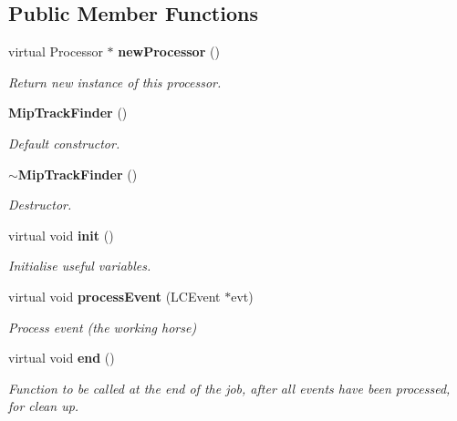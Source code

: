 \subsection*{Public Member Functions}
\begin{DoxyCompactItemize}
\item 
virtual Processor $\ast$ {\bf new\-Processor} ()\label{classCALICE_1_1MipTrackFinder_a55a7f624a6bb8628c8e8516976593d71}

\begin{DoxyCompactList}\small\item\em Return new instance of this processor. \end{DoxyCompactList}\item 
{\bf Mip\-Track\-Finder} ()\label{classCALICE_1_1MipTrackFinder_a3806b8a42dbf92ec4ed61c1c8a8fbb94}

\begin{DoxyCompactList}\small\item\em Default constructor. \end{DoxyCompactList}\item 
{\bf $\sim$\-Mip\-Track\-Finder} ()\label{classCALICE_1_1MipTrackFinder_ae52b812fd15b89fd36954dcea97b4cf2}

\begin{DoxyCompactList}\small\item\em Destructor. \end{DoxyCompactList}\item 
virtual void {\bf init} ()\label{classCALICE_1_1MipTrackFinder_a99b9bed4ba17213c6b267bfbdc0ad9ce}

\begin{DoxyCompactList}\small\item\em Initialise useful variables. \end{DoxyCompactList}\item 
virtual void {\bf process\-Event} (L\-C\-Event $\ast$evt)
\begin{DoxyCompactList}\small\item\em Process event (the working horse) \end{DoxyCompactList}\item 
virtual void {\bf end} ()\label{classCALICE_1_1MipTrackFinder_ab580d34d2e630152123a1af2e24db24a}

\begin{DoxyCompactList}\small\item\em Function to be called at the end of the job, after all events have been processed, for clean up. \end{DoxyCompactList}\end{DoxyCompactItemize}
